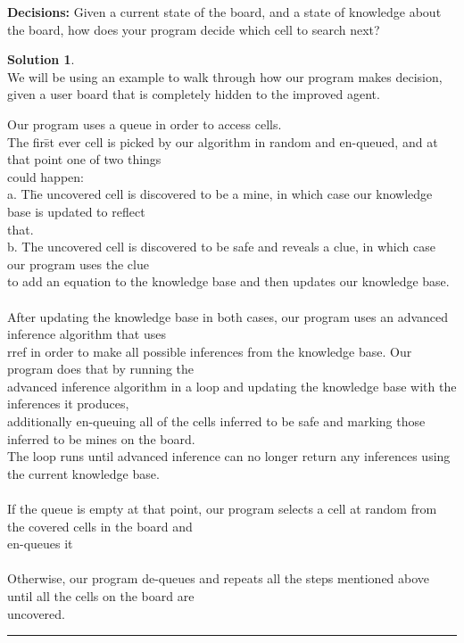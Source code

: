 \documentclass{article}
\theoremstyle{definition}
\def\fline{\rule{0.75\linewidth}{0.5pt}}
\newcommand{\finishline}{\vspace{-15pt}\begin{center}\fline\end{center}}
\newtheorem*{solution*}{Solution}
\newenvironment{solution}{\begin{solution*}}{{\finishline} \end{solution*}}
\begin{document}
\textbf{Decisions:}
	Given a current state of the board, and a state of knowledge about the board, how does your program decide which cell to search next? 
\begin{solution} \hfill \\
	We will be using an example to walk through how our program makes decision, given a user board that is completely hidden to the improved agent. 
	\begin{tabbing}
	Our program uses a queue in order to access cells. \\
	The fir\=st ever cell is picked by our algorithm in random and en-queued, and at that point one of two things \\ could happen: \\
	
	\>a. T\=he uncovered cell is discovered to be a mine, in which case our knowledge base is updated to reflect\\ \>\>that. \\
	\>b. The uncovered cell is discovered to be safe and reveals a clue, in which case our program uses the clue\\ \>\>to add an equation to the knowledge base and then updates our knowledge base. \\\\
	
	After updating the knowledge base in both cases, our program uses an advanced inference algorithm that uses\\ rref in order to make all possible inferences from the knowledge base. Our program does that by running the\\ advanced inference algorithm in a loop and updating the knowledge base with the inferences it produces, \\additionally en-queuing all of the cells inferred to be safe and marking those inferred to be mines on the board.\\ The loop runs until advanced inference can no longer return any inferences using the current knowledge base.\\\\
	
	If the queue is empty at that point, our program selects a cell at random from the covered cells in the board and\\ en-queues it\\\\
	
	Otherwise, our program de-queues and repeats all the steps mentioned above until all the cells on the board are\\ uncovered.
	\end{tabbing}
\end{solution}
\smallskip
\end{document}
